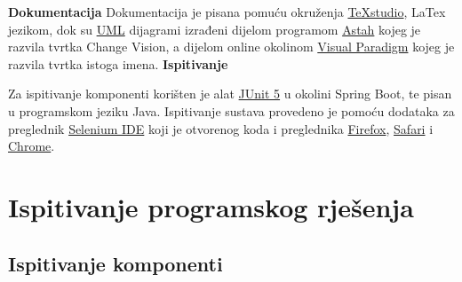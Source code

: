 			 \newline \textbf{Dokumentacija} \newline
			 Dokumentacija je pisana pomuću okruženja \href{https://www.texstudio.org/}{TeXstudio}, LaTex jezikom, dok su \href{https://www.uml-diagrams.org/}{UML} dijagrami izrađeni dijelom programom \href{https://astah.net/}{Astah} kojeg je razvila tvrtka Change Vision, a dijelom online okolinom \href{https://www.visual-paradigm.com/}{Visual Paradigm} kojeg je razvila tvrtka istoga imena.
			 \newline \textbf{Ispitivanje} \newline
			 
			 Za ispitivanje komponenti korišten je alat \href{https://junit.org/junit5/}{JUnit 5} u okolini Spring Boot, te pisan u programskom jeziku Java. Ispitivanje sustava provedeno je pomoću dodataka za preglednik \href{https://www.selenium.dev/selenium-ide/}{Selenium IDE} koji je otvorenog koda i preglednika \href{https://www.mozilla.org/en-US/firefox/new/}{Firefox}, \href{https://www.apple.com/safari/}{Safari} i \href{https://www.google.com/chrome/}{Chrome}.
			 
			\eject 
		
		\section{Ispitivanje programskog rješenja}
			
			
	
			
			\subsection{Ispitivanje komponenti}
			
